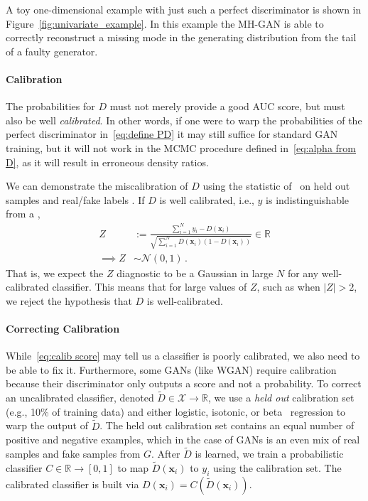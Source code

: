 \documentclass{article}
\renewcommand{\vec}[1]{{\boldsymbol{\mathbf{#1}}}} %
\newcommand{\R}{\mathbb{R}}
\newcommand{\set}[1]{\mathcal{#1}}
\newcommand{\sample}{\sim}
\newcommand{\norm}{\mathcal{N}}
\newcommand{\bern}{\textrm{Bern}}
\newcommand{\setx}{\set{X}}
\begin{document}
A toy one-dimensional example with just such a perfect discriminator is shown in Figure~\ref{fig:univariate_example}.
In this example the MH-GAN is able to correctly reconstruct a missing mode in the generating distribution from the tail of a faulty generator.

\paragraph{Calibration}
The probabilities for $D$ must not merely provide a good AUC score, but must also be well \emph{calibrated}.
In other words, if one were to warp the probabilities of the perfect discriminator in~\eqref{eq:define PD} it may still suffice for standard GAN training, but it will not work in the MCMC procedure defined in~\eqref{eq:alpha from D}, as it will result in erroneous density ratios.

We can demonstrate the miscalibration of $D$ using the statistic of~\citet{Dawid1997} on held out samples \smash{$\vec x_{1:N}$} and real/fake labels .
If $D$ is well calibrated, i.e., $y$ is indistinguishable from a \smash{$y \sample \bern(D(\vec x))$},
\begin{align}
  Z &:= \frac{\sum_{i=1}^N y_i - D(\vec x_i)}{\sqrt{\sum_{i=1}^N D(\vec x_i) (1 - D(\vec x_i))}} \in \R \label{eq:calib score} \\
  \implies Z &\sample \norm(0,1)\,.
\end{align}
That is, we expect the $Z$ diagnostic to be a Gaussian in large $N$ for any well-calibrated classifier.
This means that for large values of $Z$, such as when $|Z| > 2$, we reject the hypothesis that $D$ is well-calibrated.

\paragraph{Correcting Calibration}
While~\eqref{eq:calib score} may tell us a classifier is poorly calibrated, we also need to be able to fix it.
Furthermore, some GANs (like WGAN) require calibration because their discriminator only outputs a score and not a probability.
To correct an uncalibrated classifier, denoted $\tilde{D} \in \setx \rightarrow \R$, we use a \emph{held out} calibration set (e.g., 10\% of training data) and either logistic, isotonic, or beta~\citep{Kull2017} regression to warp the output of $\tilde{D}$.
The held out calibration set contains an equal number of positive and negative examples, which in the case of GANs is an even mix of real samples and fake samples from $G$.
After $\tilde{D}$ is learned, we train a probabilistic classifier $C \in \R \rightarrow [0,1]$ to map $\tilde{D}(\vec x_i)$ to $y_i$ using the calibration set.
The calibrated classifier is built via $D(\vec x_i) = C(\tilde{D}(\vec x_i))$.
\end{document}
